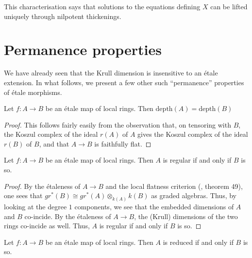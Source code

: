 \noindent
This characterisation says that solutions to the equations defining $X$ can
be lifted uniquely through nilpotent thickenings. 

\section{Permanence properties}
\label{section-properties-permanence}

\noindent
We have already seen that the Krull dimension is insensitive to an \'etale
extension. In what follows, we present a few other such ``permanence''
properties of \'etale morphisms.

\begin{proposition}
\label{proposition-etale-dimension}
Let $f:A \to B$ be an \'etale map of local rings. Then
$\mathrm{depth}(A) = \mathrm{depth}(B)$
\end{proposition}

\begin{proof}
This follows fairly easily from the observation that, on tensoring with
$B$, the Koszul complex of the ideal $r(A)$ of $A$ gives the Koszul complex
of the ideal $r(B)$ of $B$, and that $A \to B$ is faithfully flat.
\end{proof}

\begin{proposition}
\label{proposition-etale-regular}
Let $f:A \to B$ be an \'etale map of local rings. Then $A$ is regular if and
only if $B$ is so.
\end{proposition}

\begin{proof}
By the \'etaleness of $A \to B$ and the local flatness criterion
(\cite{MatCA}, theorem 49), one sees that
$gr^*(B) \cong gr^*(A) \otimes_{k(A)} k(B)$ as graded algebras. Thus,
by looking at the degree $1$ components, we see that the embedded
dimensions of $A$ and $B$ co-incide. By the \'etaleness of $A \to B$,
the (Krull) dimensions of the two rings co-incide as well. Thus, $A$ is
regular if and only if $B$ is so.
\end{proof}

\begin{proposition}
\label{proposition-etale-reduced}
Let $f:A \to B$ be an \'etale map of local rings. Then $A$ is reduced if and
only if $B$ is so.
\end{proposition}

